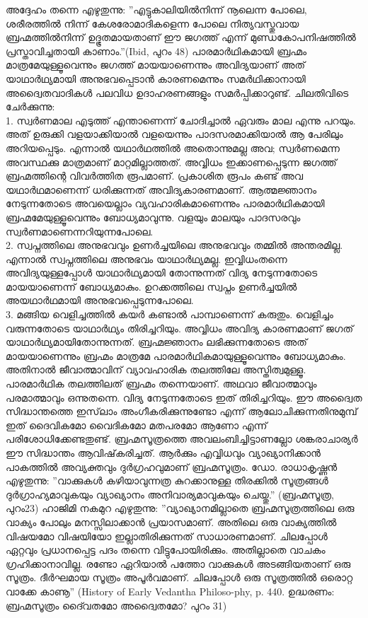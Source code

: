 അദ്ദേഹം തന്നെ എഴുതുന്നു: ''എട്ടുകാലിയില്‍നിന്ന് നൂലെന്ന പോലെ, ശരീരത്തില്‍ നിന്ന് കേശരോമാദികളെന്ന പോലെ നിത്യവസ്തുവായ ബ്രഹ്മത്തില്‍നിന്ന് ഉദ്ഭൂതമായതാണ് ഈ ജഗത്ത് എന്ന് മുണ്ഡകോപനിഷത്തില്‍ പ്രസ്താവിച്ചതായി കാണാം.''(Ibid, പുറം 48)
പാരമാര്‍ഥികമായി ബ്രഹ്മം മാത്രമേയുള്ളൂവെന്നും ജഗത്ത് മായയാണെന്നും അവിദ്യയാണ് അത് യാഥാര്‍ഥ്യമായി അനുഭവപ്പെടാന്‍ കാരണമെന്നും സമര്‍ഥിക്കാനായി അദ്വൈതവാദികള്‍ പലവിധ ഉദാഹരണങ്ങളും സമര്‍പ്പിക്കാറുണ്ട്. ചിലതിവിടെ ചേര്‍ക്കുന്നു:\\
1. സ്വര്‍ണമാല എടുത്ത് എന്താണെന്ന് ചോദിച്ചാല്‍ ഏവരും മാല എന്നു പറയും. അത് ഉരുക്കി വളയാക്കിയാല്‍ വളയെന്നും പാദസരമാക്കിയാല്‍ ആ പേരിലും അറിയപ്പെടും. എന്നാല്‍ യഥാര്‍ഥത്തില്‍ അതൊന്നുമല്ല അവ; സ്വര്‍ണമെന്ന അവസ്ഥക്കു മാത്രമാണ് മാറ്റമില്ലാത്തത്. അവ്വിധം ഇക്കാണപ്പെടുന്ന ജഗത്ത് ബ്രഹ്മത്തിന്റെ വിവര്‍ത്തിത രൂപമാണ്. പ്രകാശിത രൂപം കണ്ട് അവ യഥാര്‍ഥമാണെന്ന് ധരിക്കുന്നത് അവിദ്യകാരണമാണ്. ആത്മജ്ഞാനം നേടുന്നതോടെ അവയെല്ലാം വ്യവഹാരികമാണെന്നും പാരമാര്‍ഥികമായി ബ്രഹ്മമേയുള്ളൂവെന്നും ബോധ്യമാവുന്നു. വളയും മാലയും പാദസരവും സ്വര്‍ണമാണെന്നറിയുന്നപോലെ.\\
2. സ്വപ്നത്തിലെ അനുഭവവും ഉണര്‍ച്ചയിലെ അനുഭവവും തമ്മില്‍ അന്തരമില്ല. എന്നാല്‍ സ്വപ്നത്തിലെ അനുഭവം യാഥാര്‍ഥ്യമല്ല. ഇവ്വിധംതന്നെ അവിദ്യയുള്ളപ്പോള്‍ യാഥാര്‍ഥ്യമായി തോന്നുന്നത് വിദ്യ നേടുന്നതോടെ മായയാണെന്ന് ബോധ്യമാകും. ഉറക്കത്തിലെ സ്വപ്നം ഉണര്‍ച്ചയില്‍ അയഥാര്‍ഥമായി അനുഭവപ്പെടുന്നപോലെ.\\
3. മങ്ങിയ വെളിച്ചത്തില്‍ കയര്‍ കണ്ടാല്‍ പാമ്പാണെന്ന് കരുതും. വെളിച്ചം വരുന്നതോടെ യാഥാര്‍ഥ്യം തിരിച്ചറിയും. അവ്വിധം അവിദ്യ കാരണമാണ് ജഗത് യാഥാര്‍ഥ്യമായിതോന്നുന്നത്. ബ്രഹ്മജ്ഞാനം ലഭിക്കുന്നതോടെ അത് മായയാണെന്നും ബ്രഹ്മം മാത്രമേ പാരമാര്‍ഥികമായുള്ളൂവെന്നും ബോധ്യമാകും.\\
അതിനാല്‍ ജീവാത്മാവിന് വ്യാവഹാരിക തലത്തിലേ അസ്തിത്വമുള്ളൂ. പാരമാര്‍ഥിക തലത്തിലത് ബ്രഹ്മം തന്നെയാണ്. അഥവാ ജീവാത്മാവും പരമാത്മാവും ഒന്നുതന്നെ. വിദ്യ നേടുന്നതോടെ ഇത് തിരിച്ചറിയും.
ഈ അദ്വൈത സിദ്ധാന്തത്തെ ഇസ്‌ലാം അംഗീകരിക്കുന്നുണ്ടോ എന്ന് ആലോചിക്കുന്നതിനുമുമ്പ് ഇത് ദൈവികമോ വൈദികമോ മതപരമോ ആണോ എന്ന് പരിശോധിക്കേണ്ടതുണ്ട്. ബ്രഹ്മസൂത്രത്തെ അവലംബിച്ചിട്ടാണല്ലോ ശങ്കരാചാര്യര്‍ ഈ സിദ്ധാന്തം ആവിഷ്‌കരിച്ചത്.
ആര്‍ക്കും എവ്വിധവും വ്യാഖ്യാനിക്കാന്‍ പാകത്തില്‍ അവ്യക്തവും ദുര്‍ഗ്രഹവുമാണ് ബ്രഹ്മസൂത്രം. ഡോ. രാധാകൃഷ്ണന്‍ എഴുതുന്നു: ''വാക്കുകള്‍ കഴിയാവുന്നത്ര കുറക്കാനുള്ള തിരക്കില്‍ സൂത്രങ്ങള്‍ ദുര്‍ഗ്രാഹ്യമാവുകയും വ്യാഖ്യാനം അനിവാര്യമാവുകയും ചെയ്തു.'' (ബ്രഹ്മസൂത്ര, പുറം23)
ഹാജിമി നകമുറ എഴുതുന്നു: ''വ്യാഖ്യാനമില്ലാതെ ബ്രഹ്മസൂത്രത്തിലെ ഒരു വാക്യം പോലും മനസ്സിലാക്കാന്‍ പ്രയാസമാണ്. അതിലെ ഒരു വാക്യത്തില്‍ വിഷയമോ വിഷയിയോ ഇല്ലാതിരിക്കുന്നത് സാധാരണമാണ്. ചിലപ്പോള്‍ ഏറ്റവും പ്രധാനപ്പെട്ട പദം തന്നെ വിട്ടുപോയിരിക്കും. അതില്ലാതെ വാചകം ഗ്രഹിക്കാനാവില്ല. രണ്ടോ ഏറിയാല്‍ പത്തോ വാക്കുകള്‍ അടങ്ങിയതാണ് ഒരു സൂത്രം. ദീര്‍ഘമായ സൂത്രം അപൂര്‍വമാണ്. ചിലപ്പോള്‍ ഒരു സൂത്രത്തില്‍ ഒരൊറ്റ വാക്കേ കാണൂ'' (History of Early Vedantha Philoso-phy, p. 440. ഉദ്ധരണം: ബ്രഹ്മസൂത്രം ദൈ്വതമോ അദ്വൈതമോ? പുറം 31)
